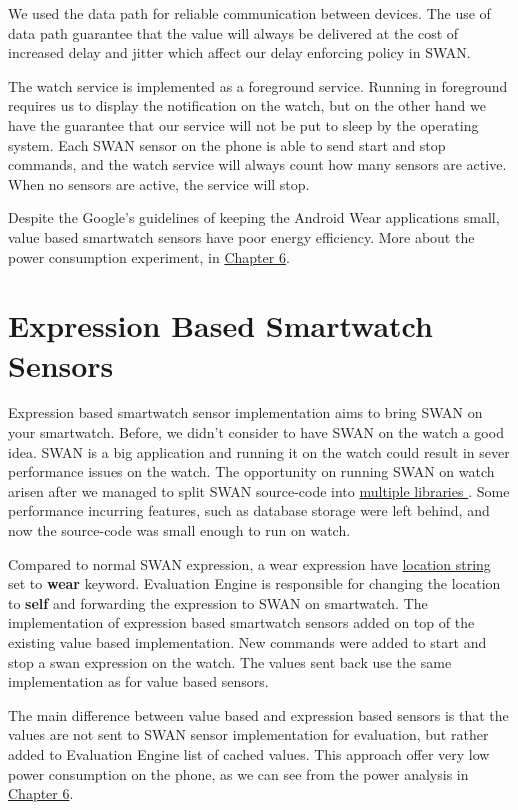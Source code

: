 We used the data path \cite{android_wear_datapath} for reliable communication between devices. The use of data path guarantee that the value will always be delivered at the cost of increased delay
and jitter\cite{jitter_ref} which affect our delay enforcing policy in SWAN.

The watch service is implemented as a foreground service\cite{foreground_service}. Running in foreground requires us to display the notification on the watch, but on the other hand we have the 
guarantee that our service will not be put to sleep by the operating system. 
Each SWAN sensor on the phone  is able to send start and stop commands, and the watch service will always count how many sensors are active. When no sensors are active, the service will stop.

Despite the Google's guidelines of keeping the Android Wear applications small, value based smartwatch sensors have poor energy efficiency. More about the power consumption experiment, 
in \hyperref[Chapter6]{Chapter 6}.

\section{Expression  Based  Smartwatch Sensors }

Expression based smartwatch sensor implementation aims to bring SWAN on your smartwatch. Before, we didn't consider to have SWAN on the watch a good idea. SWAN is a big application and running
it on the watch could result in sever performance issues on the watch. The opportunity on running SWAN on watch arisen after we managed to split SWAN source-code into \hyperref[scc:swan_split]{multiple libraries
}. Some performance incurring features, such as database storage were left behind, and now the source-code was small enough to run on watch.

Compared to normal SWAN expression, a wear expression have \hyperref[fig:SwanExpression]{location string} set to \textbf{wear} keyword. Evaluation Engine is responsible for changing the location
to \textbf{self} and forwarding the expression to SWAN on smartwatch.
The implementation of expression based smartwatch sensors added on top of the existing value based implementation. New commands were added to start and stop a swan expression on the watch.
The values sent back use the same implementation as for value based sensors. 

The main difference between value based and expression based sensors is that the values are not sent to SWAN sensor implementation for evaluation, but rather added to Evaluation Engine list of cached
values. This approach offer very low power consumption on the phone, as we can see from the power analysis in \hyperref[Chapter6]{Chapter 6}.
